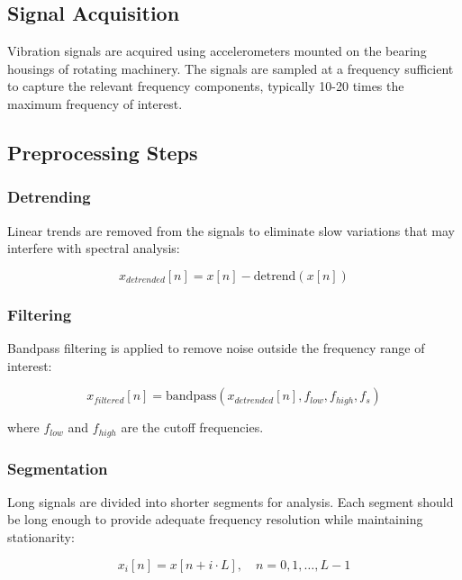 \subsection{Signal Acquisition}

Vibration signals are acquired using accelerometers mounted on the bearing housings of rotating machinery. The signals are sampled at a frequency sufficient to capture the relevant frequency components, typically 10-20 times the maximum frequency of interest.

\subsection{Preprocessing Steps}

\subsubsection{Detrending}

Linear trends are removed from the signals to eliminate slow variations that may interfere with spectral analysis:

\begin{equation}
x_{detrended}[n] = x[n] - \text{detrend}(x[n])
\end{equation}

\subsubsection{Filtering}

Bandpass filtering is applied to remove noise outside the frequency range of interest:

\begin{equation}
x_{filtered}[n] = \text{bandpass}(x_{detrended}[n], f_{low}, f_{high}, f_s)
\end{equation}

where $f_{low}$ and $f_{high}$ are the cutoff frequencies.

\subsubsection{Segmentation}

Long signals are divided into shorter segments for analysis. Each segment should be long enough to provide adequate frequency resolution while maintaining stationarity:

\begin{equation}
x_i[n] = x[n + i \cdot L], \quad n = 0, 1, \ldots, L-1
\end{equation}

